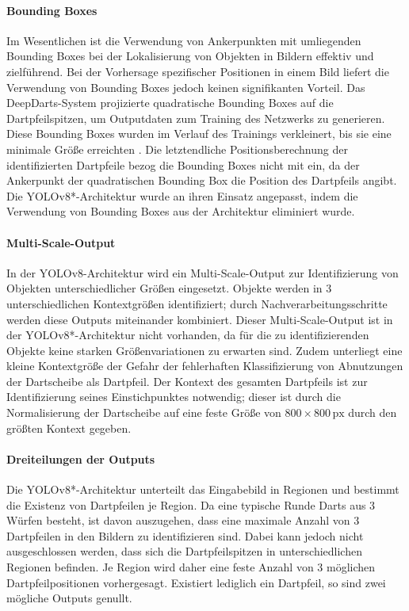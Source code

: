 \paragraph{Bounding Boxes}

Im Wesentlichen ist die Verwendung von Ankerpunkten mit umliegenden Bounding Boxes bei der Lokalisierung von Objekten in Bildern effektiv und zielführend. Bei der Vorhersage spezifischer Positionen in einem Bild liefert die Verwendung von Bounding Boxes jedoch keinen signifikanten Vorteil. Das DeepDarts-System projizierte quadratische Bounding Boxes auf die Dartpfeilspitzen, um Outputdaten zum Training des Netzwerks zu generieren. Diese Bounding Boxes wurden im Verlauf des Trainings verkleinert, bis sie eine minimale Größe erreichten \cite{deepdarts}. Die letztendliche Positionsberechnung der identifizierten Dartpfeile bezog die Bounding Boxes nicht mit ein, da der Ankerpunkt der quadratischen Bounding Box die Position des Dartpfeils angibt. Die YOLOv8*-Architektur wurde an ihren Einsatz angepasst, indem die Verwendung von Bounding Boxes aus der Architektur eliminiert wurde.

\paragraph{Multi-Scale-Output}

In der YOLOv8-Architektur wird ein Multi-Scale-Output zur Identifizierung von Objekten unterschiedlicher Größen eingesetzt. Objekte werden in 3 unterschiedlichen Kontextgrößen identifiziert; durch Nachverarbeitungsschritte werden diese Outputs miteinander kombiniert. Dieser Multi-Scale-Output ist in der YOLOv8*-Architektur nicht vorhanden, da für die zu identifizierenden Objekte keine starken Größenvariationen zu erwarten sind. Zudem unterliegt eine kleine Kontextgröße der Gefahr der fehlerhaften Klassifizierung von Abnutzungen der Dartscheibe als Dartpfeil. Der Kontext des gesamten Dartpfeils ist zur Identifizierung seines Einstichpunktes notwendig; dieser ist durch die Normalisierung der Dartscheibe auf eine feste Größe von $800 \times 800\,\text{px}$ durch den größten Kontext gegeben.

\paragraph{Dreiteilungen der Outputs}

Die YOLOv8*-Architektur unterteilt das Eingabebild in Regionen und bestimmt die Existenz von Dartpfeilen je Region. Da eine typische Runde Darts aus 3 Würfen besteht, ist davon auszugehen, dass eine maximale Anzahl von 3 Dartpfeilen in den Bildern zu identifizieren sind. Dabei kann jedoch nicht ausgeschlossen werden, dass sich die Dartpfeilspitzen in unterschiedlichen Regionen befinden. Je Region wird daher eine feste Anzahl von 3 möglichen Dartpfeilpositionen vorhergesagt. Existiert lediglich ein Dartpfeil, so sind zwei mögliche Outputs genullt.

